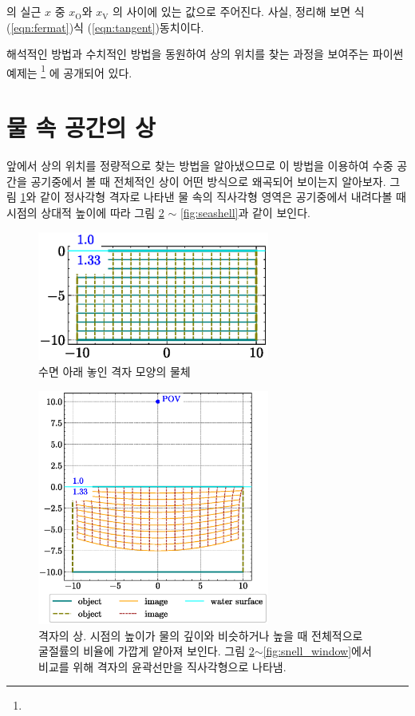 \documentclass[twocolumn]{article}
\begin{document}
의 실근 $x$ 중 $x_{\mathrm{O}}^{}$와 $x_{\mathrm{V}}^{}$ 의 사이에 있는 값으로 주어진다. 사실, 정리해 보면 식 (\ref{eqn:fermat})\는 식 (\ref{eqn:tangent})\와 동치이다.

해석적인 방법과 수치적인 방법을 동원하여 상의 위치를 찾는 과정을 보여주는 파이썬 예제는  
\href{https://github.com/mingshey/python_projects/blob/main/Refraction_Image.ipynb}%
{}\footnote{} 에 공개되어 있다.

\section{물 속 공간의 상}
앞에서 상의 위치를 정량적으로 찾는 방법을 알아냈으므로 이 방법을 이용하여 
수중 공간을 공기중에서 볼 때 전체적인 상이 어떤 방식으로 왜곡되어 보이는지  알아보자. 
그림 \ref{fig:grid_underwater}와 같이 정사각형 격자로 나타낸 물 속의 직사각형 영역은 공기중에서 내려다볼 때
시점의 상대적 높이에 따라 그림 \ref{fig:image_underwater} $\sim$ \ref{fig:seashell}과 같이 보인다.

\begin{figure}
	\centering
	\includegraphics[width=3in]{figs/grid_underwater.eps}
	\caption{수면 아래 놓인 격자 모양의 물체}
	\label{fig:grid_underwater}
\end{figure}

\begin{figure}
	\centering
	\includegraphics[width=3in]{figs/image_underwater1.eps}
	\caption{격자의 상. 시점의 높이가 물의 깊이와 비슷하거나 높을 때 전체적으로 굴절률의 비율에 가깝게 얕아져 보인다. 그림 \ref{fig:image_underwater}$\sim$\ref{fig:snell_window}에서 비교를 위해 격자의 윤곽선만을 직사각형으로 나타냄. }
	\label{fig:image_underwater}
\end{figure}
\end{document}
